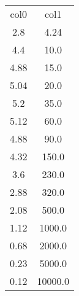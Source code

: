 \begin{table}
\begin{tabular}{cc}
col0 & col1 \\
2.8 & 4.24 \\
4.4 & 10.0 \\
4.88 & 15.0 \\
5.04 & 20.0 \\
5.2 & 35.0 \\
5.12 & 60.0 \\
4.88 & 90.0 \\
4.32 & 150.0 \\
3.6 & 230.0 \\
2.88 & 320.0 \\
2.08 & 500.0 \\
1.12 & 1000.0 \\
0.68 & 2000.0 \\
0.23 & 5000.0 \\
0.12 & 10000.0 \\
\end{tabular}
\end{table}
